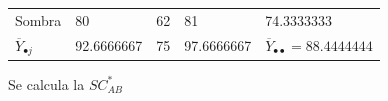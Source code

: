 \documentclass[]{book}
\theoremstyle{definition}
\theoremstyle{definition}
\theoremstyle{definition}
\theoremstyle{remark}
\begin{document}
\begin{longtable}[]{@{}lllll@{}}
\begin{minipage}[t]{0.25\columnwidth}
Sombra\strut
\end{minipage} & \begin{minipage}[t]{0.11\columnwidth}\raggedright
80\strut
\end{minipage} & \begin{minipage}[t]{0.08\columnwidth}\raggedright
62\strut
\end{minipage} & \begin{minipage}[t]{0.11\columnwidth}\raggedright
81\strut
\end{minipage} & \begin{minipage}[t]{0.31\columnwidth}\raggedright
74.3333333\strut
\end{minipage}\tabularnewline
\begin{minipage}[t]{0.25\columnwidth}\raggedright
\(\overline{Y}_{\bullet j}\)\strut
\end{minipage} & \begin{minipage}[t]{0.11\columnwidth}\raggedright
92.6666667\strut
\end{minipage} & \begin{minipage}[t]{0.08\columnwidth}\raggedright
75\strut
\end{minipage} & \begin{minipage}[t]{0.11\columnwidth}\raggedright
97.6666667\strut
\end{minipage} & \begin{minipage}[t]{0.31\columnwidth}\raggedright
\(\overline{Y}_{\bullet \bullet} = 88.4444444\)\strut
\end{minipage}\tabularnewline
\bottomrule
\end{longtable}

Se calcula la \(SC_{AB}^{*}\)
\end{document}

